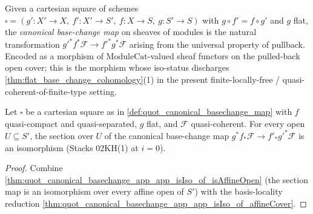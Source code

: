 \begin{definition}
  \label{def:quot_canonical_basechange_map}
  Given a cartesian square of schemes
  \(\square = (g' : X' \to X,\ f' : X' \to S',\ f : X \to S,\ g : S' \to S)\)
  with \(g \circ f' = f \circ g'\) and \(g\) flat, the
  \emph{canonical base-change map} on sheaves of modules is the natural
  transformation \(g'^* f^* \mathcal{F} \longrightarrow f'^* g^* \mathcal{F}\)
  arising from the universal property of pullback. Encoded as a morphism
  of \(\mathrm{ModuleCat}\)-valued sheaf functors on the pulled-back open
  cover; this is the morphism whose iso-status discharges
  \cref{thm:flat_base_change_cohomology}(1) in the present
  finite-locally-free / quasi-coherent-of-finite-type setting.
\end{definition}

\begin{theorem}
  \label{thm:quot_canonical_basechange_app_app_isIso}
  Let \(\square\) be a cartesian square as in
  \cref{def:quot_canonical_basechange_map} with \(f\) quasi-compact and
  quasi-separated, \(g\) flat, and \(\mathcal F\) quasi-coherent. For every
  open \(U \subseteq S'\), the section over \(U\) of the canonical
  base-change map
  \(g^* f_* \mathcal F \to f'_* g'^* \mathcal F\)
  is an isomorphism (Stacks 02KH(1) at \(i = 0\)).
\end{theorem}
\begin{proof}\leanok
  Combine \cref{thm:quot_canonical_basechange_app_app_isIso_of_isAffineOpen}
  (the section map is an isomorphism over every affine open of \(S'\)) with
  the basis-locality reduction
  \cref{thm:quot_canonical_basechange_app_app_isIso_of_affineCover}.
\end{proof}


